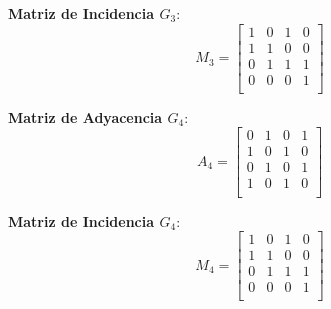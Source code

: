 \documentclass{article}
\begin{document}
\textbf{Matriz de Incidencia \( G_3 \)}:
\[
M_3 = 
\begin{bmatrix}
1 & 0 & 1 & 0 \\
1 & 1 & 0 & 0 \\
0 & 1 & 1 & 1 \\
0 & 0 & 0 & 1 \\
\end{bmatrix}
\]

\textbf{Matriz de Adyacencia \( G_4 \)}:
\[
A_4 = 
\begin{bmatrix}
0 & 1 & 0 & 1 \\
1 & 0 & 1 & 0 \\
0 & 1 & 0 & 1 \\
1 & 0 & 1 & 0 \\
\end{bmatrix}
\]

\textbf{Matriz de Incidencia \( G_4 \)}:
\[
M_4 = 
\begin{bmatrix}
1 & 0 & 1 & 0 \\
1 & 1 & 0 & 0 \\
0 & 1 & 1 & 1 \\
0 & 0 & 0 & 1 \\
\end{bmatrix}
\]
\end{document}
